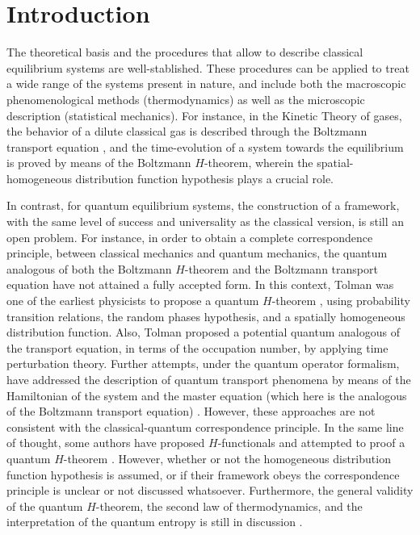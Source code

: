 \section{Introduction}

The theoretical basis and the procedures that allow to describe classical equilibrium systems
are well-stablished. These procedures can be applied to treat a wide range of the systems
present in nature, and include both the macroscopic phenomenological methods (thermodynamics)
as well as the microscopic description (statistical mechanics). For instance,
in the Kinetic Theory of gases, the behavior of a dilute classical gas
is described through the Boltzmann transport equation \cite{bib:huang},
and the time-evolution of a system towards the equilibrium is proved by
means of the Boltzmann $H$-theorem, wherein the
spatial-homogeneous distribution function hypothesis plays a crucial role.

In contrast, for quantum equilibrium systems, the construction of a framework,
with the same level of
success and universality as the classical version, is still an open problem. For instance,
in order to obtain a complete correspondence principle, between classical mechanics
and quantum mechanics, the quantum analogous of both the Boltzmann $H$-theorem
and the Boltzmann transport equation have not attained a fully accepted form.
In this context, Tolman was one of the earliest physicists to propose a quantum
$H$-theorem \cite{bib:tolman}, using probability transition relations, the random
phases hypothesis, and a spatially homogeneous distribution function.
Also, Tolman proposed a potential quantum analogous of the transport equation,
in terms of the occupation number,
by applying time perturbation theory. Further attempts, under the quantum operator
formalism, have addressed the description of quantum transport phenomena by means of the Hamiltonian
of the system and the master equation (which here is the analogous
of the Boltzmann transport equation)
\cite{bib:gorban2014,bib:bennaim2017,bib:tolman,bib:li2019}. However, these approaches 
are not consistent with the classical-quantum correspondence principle.
In the same line of thought, some authors have proposed $H$-functionals
and attempted to proof a
quantum $H$-theorem \cite{bib:silva2010,bib:deroeck2006,bib:grabert1974}.
However, whether or not the homogeneous distribution function hypothesis is assumed, or
if their framework obeys the correspondence principle is unclear or not discussed whatsoever.
Furthermore, the general validity
of the quantum $H$-theorem, the second law of thermodynamics, and the
interpretation of the quantum entropy is still in discussion %
\cite{bib:silva2010,bib:deroeck2006,bib:grabert1974,bib:acharya2019,%
bib:kastner2017,bib:gring2012,bib:han2015,bib:das2018}.

